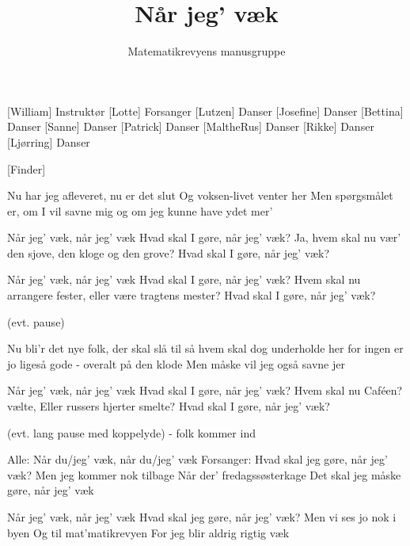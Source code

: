 \documentclass[a4paper,11pt]{article}
\title{Når jeg' væk}
\author{Matematikrevyens manusgruppe}
\begin{document}
\maketitle

\begin{roles}
[William] Instruktør
[Lotte] Forsanger
[Lutzen] Danser
[Josefine] Danser
[Bettina] Danser
[Sanne] Danser
[Patrick] Danser
[MaltheRus] Danser
[Rikke] Danser
[Ljørring] Danser
\end{roles}

\begin{props}
[Finder]
\end{props}

\begin{song}
Nu har jeg afleveret, nu er det slut
Og voksen-livet venter her
Men spørgsmålet er, om I vil savne mig
og om jeg kunne have ydet mer’

Når jeg’ væk, når jeg’ væk
Hvad skal I gøre, når jeg’ væk?
Ja, hvem skal nu vær’ den sjove,
den kloge og den grove?
Hvad skal I gøre, når jeg’ væk?

Når jeg’ væk, når jeg’ væk
Hvad skal I gøre, når jeg’ væk?
Hvem skal nu arrangere fester,
eller være tragtens mester?
Hvad skal I gøre, når jeg’ væk?

(evt. pause)

Nu bli’r det nye folk, der skal slå til
så hvem skal dog underholde her
for ingen er jo ligeså gode - overalt på den klode
Men måske vil jeg også savne jer

Når jeg’ væk, når jeg’ væk
Hvad skal I gøre, når jeg’ væk?
Hvem skal nu Caféen? vælte,
Eller russers hjerter smelte?
Hvad skal I gøre, når jeg’ væk?

(evt. lang pause med koppelyde) - folk kommer ind

Alle: Når du/jeg’ væk, når du/jeg’ væk
Forsanger: Hvad skal jeg gøre, når jeg’ væk?
Men jeg kommer nok tilbage
Når der’ fredagssøsterkage
Det skal jeg måske gøre, når jeg’ væk

Når jeg’ væk, når jeg’ væk
Hvad skal jeg gøre, når jeg’ væk?
Men vi ses jo nok i byen
Og til mat’matikrevyen
For jeg blir aldrig rigtig væk

\end{song}
\end{document}
